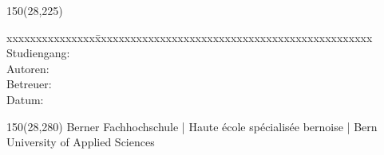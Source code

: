 \begin{titlepage}
\begin{flushleft}
\begin{textblock}{150}(28,225)
\fontsize{10pt}{17pt}\selectfont
\begin{tabbing}
xxxxxxxxxxxxxxx\=xxxxxxxxxxxxxxxxxxxxxxxxxxxxxxxxxxxxxxxxxxxxxxx \kill
Studiengang:	\> [Informatik]	\\			%
Autoren:				\\					%
Betreuer:				\\					%
Datum:			\> \versiondate					\\		%
\end{tabbing}

\end{textblock}
\end{flushleft}

\begin{textblock}{150}(28,280)
\noindent 
\color{bfhgrey}\fontsize{9pt}{10pt}\selectfont
Berner Fachhochschule | Haute école spécialisée bernoise | Bern University of Applied Sciences
\color{black}\selectfont
\end{textblock}


\end{titlepage}

%
%
